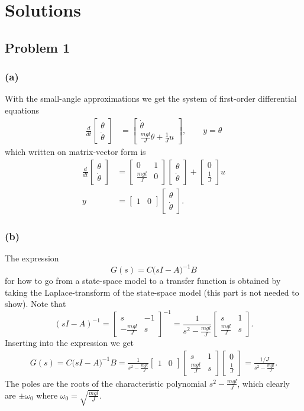 \documentclass[letterpaper,12pt]{article}
\newcommand{\bbm}{\begin{bmatrix}}
\newcommand{\ebm}{\end{bmatrix}}
\begin{document}

\section*{Solutions}

\subsection*{Problem 1}
\subsubsection*{(a)}
With the small-angle approximations we get the system of first-order differential equations
\begin{equation*}
\begin{aligned}
\frac{d}{dt}  \bbm \theta\\\dot{\theta} \ebm &= \bbm \dot{\theta}\\ \frac{mgl}{J}\theta + \frac{1}{J}u \ebm, \qquad y = \theta
\end{aligned}
\end{equation*}
which written on matrix-vector form is 
\begin{equation*}
\begin{aligned}
\frac{d}{dt}  \bbm \theta\\\dot{\theta} \ebm &= \bbm 0 & 1\\ \frac{mgl}{J} & 0\ebm \bbm \theta\\\dot{\theta} \ebm + \bbm 0\\\frac{1}{J} \ebm u\\
y &= \bbm 1 & 0 \ebm \bbm \theta\\\dot{\theta} \ebm.
\end{aligned}
\end{equation*}

\subsubsection*{(b)}
The expression 
\begin{equation*}
G(s) = C \big( sI- A\big)^{-1} B
\end{equation*}
for how to go from a state-space model to a transfer function is obtained by taking the Laplace-transform of the state-space model (this part is not needed to show). Note that 
\[ (sI-A)^{-1} = \bbm s & -1\\-\frac{mgl}{J} & s\ebm^{-1} = \frac{1}{s^2 - \frac{mgl}{J}} \bbm s & 1\\\frac{mgl}{J} & s\ebm. \]
Inserting into the expression we get
\begin{equation*}
\begin{aligned}
G(s) = C \big( sI- A\big)^{-1} B = \frac{1}{s^2 - \frac{mgl}{J}}  \bbm 1 & 0 \ebm \bbm s & 1\\\frac{mgl}{J} & s\ebm \bbm 0\\\frac{1}{J}\ebm = \frac{ 1/J }{s^2 - \frac{mgl}{J}}.
\end{aligned}
\end{equation*}
The poles are the roots of the characteristic polynomial \(s^2 - \frac{mgl}{J}\), which clearly are
\(\pm \omega_0\) where \(\omega_0 = \sqrt{\frac{mgl}{J}}\).
\end{document}
